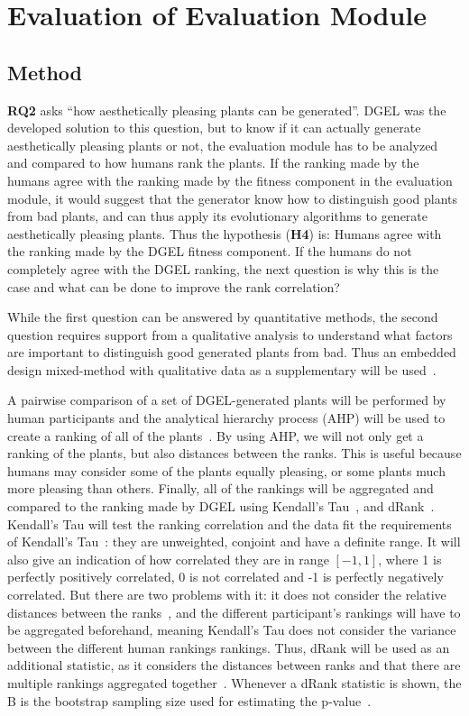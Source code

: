 \section{Evaluation of Evaluation Module}
\subsection{Method}
\textbf{RQ2} asks ``how aesthetically pleasing plants can be generated''.
DGEL was the developed solution to this question, but to know if it can actually generate aesthetically pleasing plants or not, the evaluation module has to be analyzed and compared to how humans rank the plants.
If the ranking made by the humans agree with the ranking made by the fitness component in the evaluation module, it would suggest that the generator know how to distinguish good plants from bad plants, and can thus apply its evolutionary algorithms to generate aesthetically pleasing plants.
Thus the hypothesis (\textbf{H4}) is: Humans agree with the ranking made by the DGEL fitness component.
If the humans do not completely agree with the DGEL ranking, the next question is why this is the case and what can be done to improve the rank correlation?

While the first question can be answered by quantitative methods, the second question requires support from a qualitative analysis to understand what factors are important to distinguish good generated plants from bad.
Thus an embedded design mixed-method with qualitative data as a supplementary will be used~\cite{PracticalResearch}.

A pairwise comparison of a set of DGEL-generated plants will be performed by human participants and the analytical hierarchy process (AHP) will be used to create a ranking of all of the plants~\cite{2008Saaty}.
By using AHP, we will not only get a ranking of the plants, but also distances between the ranks.
This is useful because humans may consider some of the plants equally pleasing, or some plants much more pleasing than others.
Finally, all of the rankings will be aggregated and compared to the ranking made by DGEL using Kendall's Tau~\cite{1938Kendall}, and dRank~\cite{2009Carterette}.
Kendall's Tau will test the ranking correlation and the data fit the requirements of Kendall's Tau~\cite{2010Webber}: they are unweighted, conjoint and have a definite range.
It will also give an indication of how correlated they are in range $[-1, 1]$, where 1 is perfectly positively correlated, 0 is not correlated and -1 is perfectly negatively correlated.
But there are two problems with it: it does not consider the relative distances between the ranks~\cite{2010Webber}, and the different participant's rankings will have to be aggregated beforehand, meaning Kendall's Tau does not consider the variance between the different human rankings rankings.
Thus, dRank will be used as an additional statistic, as it considers the distances between ranks and that there are multiple rankings aggregated together~\cite{2010Webber,2009Carterette}.
Whenever a dRank statistic is shown, the B is the bootstrap sampling size used for estimating the p-value~\cite{2009Carterette}.

